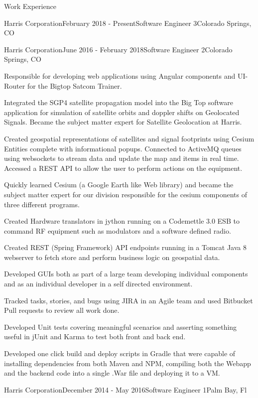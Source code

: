 \documentclass{resume} %
\begin{document}
\begin{rSection}{Work Experience}
\begin{rSubsection}{Harris Corporation}{February 2018 - Present}{Software Engineer 3}{Colorado Springs, CO}
\newpage
\end{rSubsection}
\begin{rSubsection}{Harris Corporation}{June 2016 - February 2018}{Software Engineer 2}{Colorado Springs, CO}
\item Responsible for developing web applications using Angular components and UI-Router for the Bigtop Satcom Trainer. 
\item Integrated the SGP4 satellite propagation model into the Big Top software application for simulation of satellite orbits and doppler shifts on Geolocated Signals. Became the subject matter expert for Satellite Geolocation at Harris. 
\item Created geospatial representations of satellites and signal footprints using Cesium Entities complete with informational popups. Connected to ActiveMQ queues using websockets to stream data and update the map and items in real time. Accessed a REST API to allow the user to perform actions on the equipment.
\item Quickly learned Cesium (a Google Earth like Web library) and became the subject matter expert for our division responsible for the cesium components of three different programs. 
\item Created Hardware translators in jython running on a Codemettle 3.0 ESB to command RF equipment such as modulators and a software defined radio. 
\item Created REST (Spring Framework) API endpoints running in a Tomcat Java 8 webserver to fetch store and perform business logic on geospatial data.
\item Developed GUIs both as part of a large team developing individual components and as an individual developer in a self directed environment. 
\item Tracked tasks, stories, and bugs using JIRA in an Agile team and used Bitbucket Pull requests to review all work done. 
\item Developed Unit tests covering meaningful scenarios and asserting something useful in jUnit and Karma to test both front and back end. 
\item Developed one click build and deploy scripts in Gradle that were capable of installing dependencies from both Maven and NPM, compiling both the Webapp and the backend code into a single .War file and deploying it to a VM. 
\end{rSubsection}
\begin{rSubsection}{Harris Corporation}{December 2014 - May 2016}{Software Engineer 1}{Palm Bay, Fl}

\end{rSubsection}
\end{rSection}
\end{document}
